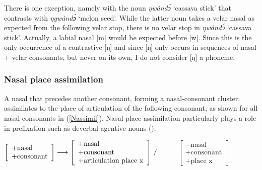 There is one exception, namely with the noun {\itshape ŋwándɔ́} `cassava stick' that contrasts with {\itshape ŋgwàndɔ́} `melon seed'. While the latter noun takes a velar nasal as expected from the following velar stop, there is no velar stop in {\itshape ŋwándɔ́} `cassava stick'. Actually, a labial nasal [m] would be expected before [w]. Since this is the only occurrence of a contrastive [ŋ] and since [ŋ] only occurs in sequences of nasal + velar consonants, but never on its own, I do not consider [ŋ] a phoneme. 




\subsubsection{Nasal place assimilation} 
\label{sec:NPlaceAss}

A nasal that precedes another consonant, forming a nasal-consonant cluster, assimilates to the place of articulation of the following consonant, as shown for all nasal consonants in (\ref{Nassimil}). Nasal place assimilation particularly plays a role in prefixation such as deverbal agentive nouns ().

\iffalse

\begin{math}
\left[
\begin{array}{l}
+\mbox{nasal} \\
+\mbox{consonant}
\end{array}
\right]
\longrightarrow 
\left[
\begin{array}{l}
+\mbox{nasal} \\
+\mbox{consonant} \\
+\mbox{articulation place x}
\end{array}
\right]
\left. \middle/ 
\right.
\end{math} %
\setul{.5cm}{.4pt}%
\ul{$\qquad$} 
\begin{math}
\left[
\begin{array}{l}
-\mbox{nasal} \\
+\mbox{consonant}  \\
+\mbox{place x} 
\end{array}
\right]
\end{math}

